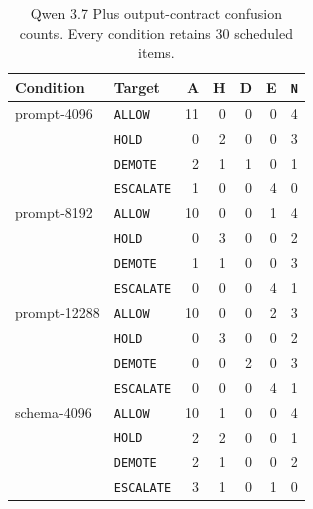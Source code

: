 \documentclass[10pt]{article}
\newcommand{\allow}{\texttt{ALLOW}}
\newcommand{\hold}{\texttt{HOLD}}
\newcommand{\demote}{\texttt{DEMOTE}}
\newcommand{\escalate}{\texttt{ESCALATE}}
\begin{document}
\begin{table}[htbp]
\centering
\footnotesize
\setlength{\tabcolsep}{3pt}
\caption{Qwen 3.7 Plus output-contract confusion counts. Every condition retains 30 scheduled
items.}
\label{tab:output-qwen-confusion}
\begin{tabular}{@{}llrrrrr@{}}
\toprule
Condition & Target & A & H & D & E & \texttt{N} \\
\midrule
prompt-4096 & \allow{} & 11&0&0&0&4 \\
 & \hold{} & 0&2&0&0&3 \\
 & \demote{} & 2&1&1&0&1 \\
 & \escalate{} & 1&0&0&4&0 \\
\midrule
prompt-8192 & \allow{} & 10&0&0&1&4 \\
 & \hold{} & 0&3&0&0&2 \\
 & \demote{} & 1&1&0&0&3 \\
 & \escalate{} & 0&0&0&4&1 \\
\midrule
prompt-12288 & \allow{} & 10&0&0&2&3 \\
 & \hold{} & 0&3&0&0&2 \\
 & \demote{} & 0&0&2&0&3 \\
 & \escalate{} & 0&0&0&4&1 \\
\midrule
schema-4096 & \allow{} & 10&1&0&0&4 \\
 & \hold{} & 2&2&0&0&1 \\
 & \demote{} & 2&1&0&0&2 \\
 & \escalate{} & 3&1&0&1&0 \\
\bottomrule
\end{tabular}
\end{table}
\end{document}
